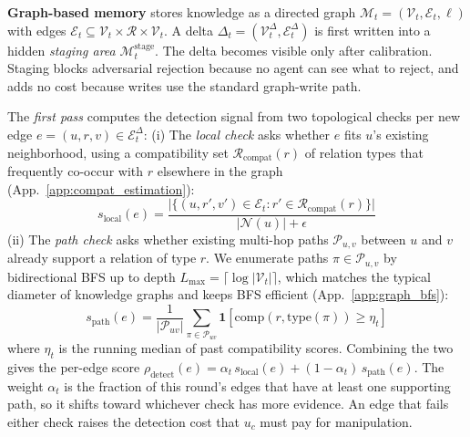 \textbf{Graph-based memory} stores knowledge as a directed graph
$\mathcal{M}_t = (\mathcal{V}_t, \mathcal{E}_t, \ell)$ with edges
$\mathcal{E}_t \subseteq \mathcal{V}_t \times \mathcal{R} \times
\mathcal{V}_t$. A delta $\Delta_t = (\mathcal{V}_t^\Delta,
\mathcal{E}_t^\Delta)$ is first written into a hidden \emph{staging
area} $\mathcal{M}_t^{\text{stage}}$. The delta becomes visible only
after calibration. Staging blocks adversarial rejection because no
agent can see what to reject, and adds no cost because writes use
the standard graph-write path.

The \emph{first pass} computes the detection signal from two
topological checks per new edge $e = (u, r, v) \in
\mathcal{E}_t^\Delta$: (i) The \textit{local check} asks whether $e$
fits $u$'s existing neighborhood, using a compatibility set
$\mathcal{R}_{\text{compat}}(r)$ of relation types that frequently
co-occur with $r$ elsewhere in the graph
(App.~\ref{app:compat_estimation}):
\begin{equation}
    s_{\text{local}}(e) =
    \frac{\bigl|\{(u, r', v') \in \mathcal{E}_t :
    r' \in \mathcal{R}_{\text{compat}}(r)\}\bigr|}
    {|\mathcal{N}(u)| + \epsilon}
\end{equation}
(ii) The \textit{path check} asks whether existing multi-hop paths $\mathcal{P}_{u,v}$
between $u$ and $v$ already support a relation of type $r$. We
enumerate paths $\pi \in \mathcal{P}_{u,v}$ by bidirectional BFS up to depth $L_{\max} = \lceil
\log |\mathcal{V}_t| \rceil$, which matches the typical diameter of
knowledge graphs and keeps BFS efficient
(App.~\ref{app:graph_bfs}):
\begin{equation}
    s_{\text{path}}(e) =
    \frac{1}{|\mathcal{P}_{uv}|}
    \sum_{\pi \in \mathcal{P}_{uv}}
    \mathbf{1}\!\left[
        \text{comp}(r, \text{type}(\pi)) \geq \eta_t
    \right]
    \label{eq:path-check}
\end{equation}
where $\eta_t$ is the running median of past compatibility scores.
Combining the two gives the per-edge score $\rho_{\text{detect}}(e) =
\alpha_t \, s_{\text{local}}(e) + (1 - \alpha_t) \, s_{\text{path}}(e)$.
The weight $\alpha_t$ is the fraction of this round's edges that have
at least one supporting path, so it shifts toward whichever check has
more evidence. An edge that fails either check raises the detection
cost that $u_c$ must pay for manipulation.

